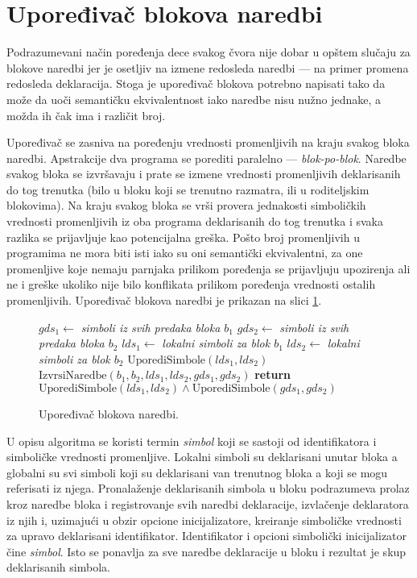 \section{Upoređivač blokova naredbi}
\label{sec:ASTComparingBlocks}

Podrazumevani način poređenja dece svakog čvora nije dobar u opštem slučaju za blokove naredbi jer je osetljiv na izmene redosleda naredbi --- na primer promena redosleda deklaracija. Stoga je upoređivač blokova potrebno napisati tako da može da uoči semantičku ekvivalentnost iako naredbe nisu nužno jednake, a možda ih čak ima i različit broj.

Upoređivač se zasniva na poređenju vrednosti promenljivih na kraju svakog bloka naredbi. Apstrakcije dva programa se porediti paralelno --- \emph{blok-po-blok}. Naredbe svakog bloka se izvršavaju i prate se izmene vrednosti promenljivih deklarisanih do tog trenutka (bilo u bloku koji se trenutno razmatra, ili u roditeljskim blokovima). Na kraju svakog bloka se vrši provera jednakosti simboličkih vrednosti promenljivih iz oba programa deklarisanih do tog trenutka i svaka razlika se prijavljuje kao potencijalna greška. Pošto broj promenljivih u programima ne mora biti isti iako su oni semantički ekvivalentni, za one promenljive koje nemaju parnjaka prilikom poređenja se prijavljuju upozirenja ali ne i greške ukoliko nije bilo konflikata prilikom poređenja vrednosti ostalih promenljivih. Upoređivač blokova naredbi je prikazan na slici \ref{fig:ComparisonAlgorithmBlocksPseudo}.

\begin{figure}[!h]
\begin{algorithmic}[1]
\State $gds_1 \gets $ \emph{simboli iz svih predaka bloka $b_1$}
\State $gds_2 \gets $ \emph{simboli iz svih predaka bloka $b_2$}
\State $lds_1 \gets $ \emph{lokalni simboli za blok $b_1$}
\State $lds_2 \gets $ \emph{lokalni simboli za blok $b_2$}
\State $\text{UporediSimbole}(lds_1, lds_2)$
\State $\text{IzvrsiNaredbe}(b_1, b_2, lds_1, lds_2, gds_1, gds_2)$
\State \textbf{return} $\text{UporediSimbole}(lds_1, lds_2) \wedge \text{UporediSimbole}(gds_1, gds_2)$
\EndProcedure
\end{algorithmic}
\caption{Upoređivač blokova naredbi.}
\label{fig:ComparisonAlgorithmBlocksPseudo}
\end{figure}

U opisu algoritma se koristi termin \emph{simbol} koji se sastoji od identifikatora i simboličke vrednosti promenljive. Lokalni simboli su deklarisani unutar bloka a globalni su svi simboli koji su deklarisani van trenutnog bloka a koji se mogu referisati iz njega. Pronalaženje deklarisanih simbola u bloku podrazumeva prolaz kroz naredbe bloka i registrovanje svih naredbi deklaracije, izvlačenje deklaratora iz njih i, uzimajući u obzir opcione inicijalizatore, kreiranje simboličke vrednosti za upravo deklarisani identifikator. Identifikator i opcioni simbolički inicijalizator čine \emph{simbol}. Isto se ponavlja za sve naredbe deklaracije u bloku i rezultat je skup deklarisanih simbola.

